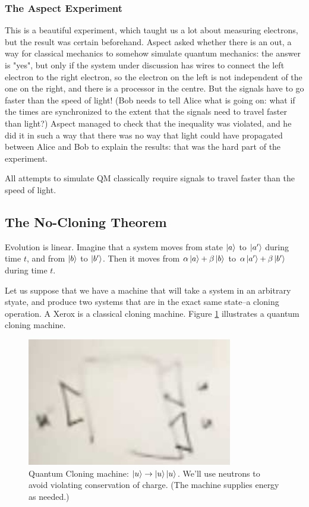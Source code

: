 \documentclass[]{article}
\begin{document}
\subsubsection{The Aspect Experiment\cite{aspect1982experimental}}
This is a beautiful experiment, which taught us a lot about measuring electrons, but the result was certain beforehand. Aspect asked whether there is an out, a way for classical mechanics to somehow simulate quantum mechanics: the answer is "yes", but only if the system under discussion has wires to connect the left electron to the right electron, so the electron on the left is not independent of the one on the right, and there is a processor in the centre. But the signals have to go faster than the speed of light! (Bob needs to tell Alice what is going on: what if the times are synchronized to the extent that the signals need to travel faster than light?) Aspect managed to check that the inequality was violated, and he did it in such a way that there was no way that light could have propagated between Alice and Bob to explain the results: that was the hard part of the experiment.

All attempts to simulate QM classically require signals to travel faster than the speed of light.

\subsection{The No-Cloning Theorem}

Evolution is linear. Imagine that a system moves from state $\ket{a}$ to $\ket{a^{\prime}}$ during time $t$, and from  $\ket{b}$ to $\ket{b^{\prime}}$. Then it moves from $\alpha \ket{a} + \beta \ket{b}$ to $\alpha \ket{a^{\prime}} + \beta \ket{b^{\prime}}$ during time $t$.

Let us suppose that we have a machine that will take a system in an arbitrary styate, and produce two systems that are in the exact same state--a cloning operation. A Xerox is a classical cloning machine.  Figure \ref{fig:quantum:cloning:machine} illustrates a quantum cloning machine.

\begin{figure}[H]
	\caption[Quantum Cloning machine: $\ket{u}\rightarrow \ket{u}\ket{u}$]{Quantum Cloning machine: $\ket{u}\rightarrow \ket{u} \ket{u}$. We'll use neutrons to avoid violating conservation of charge. (The machine supplies energy as needed.)}\label{fig:quantum:cloning:machine}
	\includegraphics[width=0.8\textwidth]{quantum-cloning-machine}
\end{figure}
\end{document}
